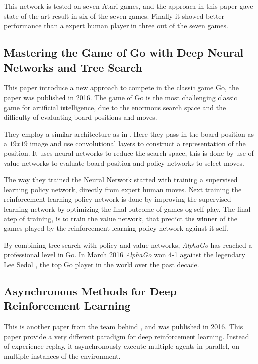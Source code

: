 This network is tested on seven Atari games, and the approach in this paper gave state-of-the-art result in six of the seven games. Finally it showed better performance than a expert human player in three out of the seven games.  

\subsection{Mastering the Game of Go with Deep Neural Networks and Tree Search}\cite{Silver_2016}
This paper introduce a new approach to compete in the classic game Go, the paper was published in 2016. The game of Go is the most challenging classic game for artificial intelligence, due to the enormous search space and the difficulty of evaluating board positions and moves. 

They employ a similar architecture as in \cite{DBLP:journals/corr/MnihKSGAWR13}. Here they pass in the board position as a $19 x 19$ image and use convolutional layers to construct a representation of the position. It uses neural networks to reduce the search space, this is done by use of value networks to evaluate board position and policy networks to select moves.

The way they trained the Neural Network started with training a supervised learning policy network, directly from expert human moves. Next training the reinforcement learning policy network is done by improving the supervised learning network by optimizing the final outcome of games og self-play. The final atep of training, is to train the value network, that predict the winner of the games played by the reinforcement learning policy network against it self.   

By combining tree search with policy and value networks, \textit{AlphaGo} has reached a professional level in Go. In March 2016 \textit{AlphaGo} won 4-1 against the legendary Lee Sedol , the top Go player in the world over the past decade.  

\subsection{Asynchronous Methods for Deep Reinforcement Learning}\cite{DBLP:journals/corr/MnihBMGLHSK16}
This is another paper from the team behind \cite{DBLP:journals/corr/MnihKSGAWR13}, and was published in 2016. This paper provide a very different paradigm for deep reinforcement learning. Instead of experience replay, it asynchronously execute multiple agents in parallel, on multiple instances of the environment. 

